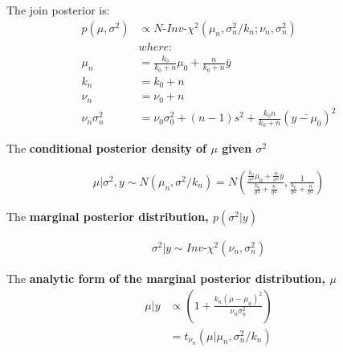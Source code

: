 \documentclass[]{article}
\begin{document}
The join posterior is:
$$
\begin{aligned}
			p(\mu, \sigma^2) &\propto N \mbox{-} Inv \mbox{-} \chi^2(\mu_n, \sigma_n^2/k_n; \nu_n, \sigma_n^2)\\
			&where:\\
			\mu_n &= \frac{k_0}{k_0 + n}\mu_0  +  \frac{n}{k_0 + n}\bar{y}\\
			k_n   &= k_0 + n\\
			\nu_n &= \nu_0 + n\\
			\nu_n \sigma_n^2 &= \nu_0 \sigma_0^2 + (n-1)s^2 + \frac{k_0n}{k_0 + n}(\bar{y - \mu_0})^2
\end{aligned}
$$

The \textbf{conditional posterior density of $\mu$ given $\sigma^2$}

$$
\begin{aligned}
			\mu|\sigma^2,y \sim N\left(  \mu_n, \sigma^2/k_n \right) = N\left( \frac{ \frac{k_0}{\sigma^2}\mu_0 +  \frac{n}{\sigma^2}\bar{y} }{  \frac{k_0}{\sigma^2} +  \frac{n}{\sigma^2}  },  \frac{1 }{  \frac{k_0}{\sigma^2} +  \frac{n}{\sigma^2}  }  \right)
\end{aligned}
$$

The \textbf{marginal posterior distribution, $p(\sigma^2|y)$}

$$
\begin{aligned}
			\sigma^2|y \sim  Inv\mbox{-}\chi^2 \left(\nu_n, \sigma_n^2  \right)
\end{aligned}
$$


The \textbf{analytic form of the marginal posterior distribution, $\mu$}
$$
\begin{aligned}
			\mu|y &\propto  \left( 1+ \frac{k_n(\mu - \mu_n)^2}{  \nu_n\sigma_n^2  }  \right) \\
			       &=t_{\nu_n}  \left(  \mu|\mu_n, \sigma_n^2/k_n   \right)
\end{aligned}
$$
\end{document}
